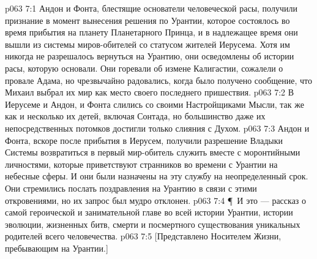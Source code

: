 \vs p063 7:1 Андон и Фонта, блестящие основатели человеческой расы, получили признание в момент вынесения решения по Урантии, которое состоялось во время прибытия на планету Планетарного Принца, и в надлежащее время они вышли из системы миров\hyp{}обителей со статусом жителей Иерусема. Хотя им никогда не разрешалось вернуться на Урантию, они осведомлены об истории расы, которую основали. Они горевали об измене Калигастии, сожалели о провале Адама, но чрезвычайно радовались, когда было получено сообщение, что Михаил выбрал их мир как место своего последнего пришествия.
\vs p063 7:2 В Иерусеме и Андон, и Фонта слились со своими Настройщиками Мысли, так же как и несколько их детей, включая Сонтада, но большинство даже их непосредственных потомков достигли только слияния с Духом.
\vs p063 7:3 Андон и Фонта, вскоре после прибытия в Иерусем, получили разрешение Владыки Системы возвратиться в первый мир\hyp{}обитель служить вместе с моронтийными личностями, которые приветствуют странников во времени с Урантии на небесные сферы. И они были назначены на эту службу на неопределенный срок. Они стремились послать поздравления на Урантию в связи с этими откровениями, но их запрос был мудро отклонен.
\vs p063 7:4 \P\ И это --- рассказ о самой героической и занимательной главе во всей истории Урантии, истории эволюции, жизненных битв, смерти и посмертного существования уникальных родителей всего человечества.
\vs p063 7:5 [Представлено Носителем Жизни, пребывающим на Урантии.]
